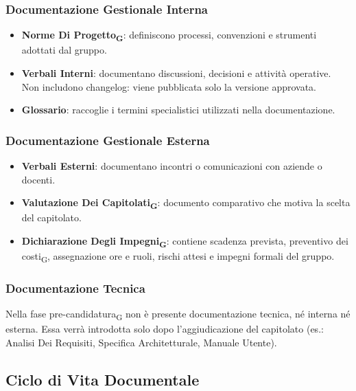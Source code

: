 \subsubsection{Documentazione Gestionale Interna}

\begin{itemize}
    \item \textbf{Norme Di Progetto\textsubscript{G}}: definiscono processi, convenzioni e strumenti adottati dal gruppo.
    \item \textbf{Verbali Interni}: documentano discussioni, decisioni e attività operative. Non
    includono changelog: viene pubblicata solo la versione approvata.
    \item \textbf{Glossario}: raccoglie i termini specialistici utilizzati nella documentazione.
\end{itemize}

\subsubsection{Documentazione Gestionale Esterna}

\begin{itemize}
    \item \textbf{Verbali Esterni}: documentano incontri o comunicazioni con aziende o docenti.
    \item \textbf{Valutazione Dei Capitolati\textsubscript{G}}: documento comparativo che motiva la scelta del capitolato.
    \item \textbf{Dichiarazione Degli Impegni\textsubscript{G}}: contiene scadenza prevista, preventivo dei costi\textsubscript{G},
    assegnazione ore e ruoli, rischi attesi e impegni formali del gruppo.
\end{itemize}

\subsubsection{Documentazione Tecnica}

Nella fase pre-candidatura\textsubscript{G} non è presente documentazione tecnica, né interna né esterna.
Essa verrà introdotta solo dopo l’aggiudicazione del capitolato (es.: Analisi Dei Requisiti,
Specifica Architetturale, Manuale Utente).

\subsection{Ciclo di Vita Documentale}

